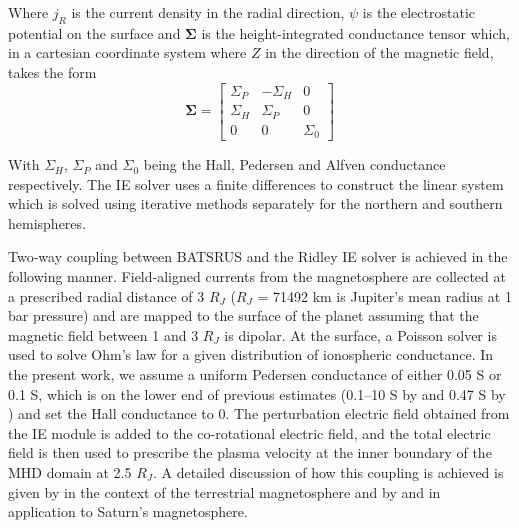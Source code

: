 Where $j_R$ is the current density in the radial direction, $\psi$ is the electrostatic potential on the surface and $\mathbf{\Sigma}$ is the height-integrated conductance tensor which, in a cartesian coordinate system where $Z$ in the direction of the magnetic field, takes the form 
\begin{equation}
    \mathbf{\Sigma} = \left[ \begin{array}{ccc}
    \Sigma_P     &-\Sigma_H   &0  \\
    \Sigma_H     &\Sigma_P   &0  \\
    0          &0        &\Sigma_0
    \end{array} \right]
\end{equation}

With $\Sigma_H$, $\Sigma_P$ and $\Sigma_0$ being the Hall, Pedersen and Alfven conductance respectively. The IE solver uses a finite differences to construct the linear system which is solved using iterative methods separately for the northern and southern hemispheres.

Two‐way coupling between BATSRUS and the Ridley IE solver is achieved in the following manner. Field‐aligned currents from the magnetosphere are collected at a prescribed radial distance of 3 $R_J$ ($R_J$ = 71492 km is Jupiter's mean radius at 1 bar pressure) and are mapped to the surface of the planet assuming that the magnetic field between 1 and 3 $R_J$ is dipolar. At the surface, a Poisson solver is used to solve Ohm's law for a given distribution of ionospheric conductance. In the present work, we assume a uniform Pedersen conductance of either 0.05 S or 0.1 S, which is on the lower end of previous estimates (0.1–10 S by  and 0.47 S by ) and set the Hall conductance to 0. The perturbation electric field obtained from the IE module is added to the co-rotational electric field, and the total electric field is then used to prescribe the plasma velocity at the inner boundary of the MHD domain at 2.5 $R_J$. A detailed discussion of how this coupling is achieved is given by  in the context of the terrestrial magnetosphere and by  and  in application to Saturn's magnetosphere.

